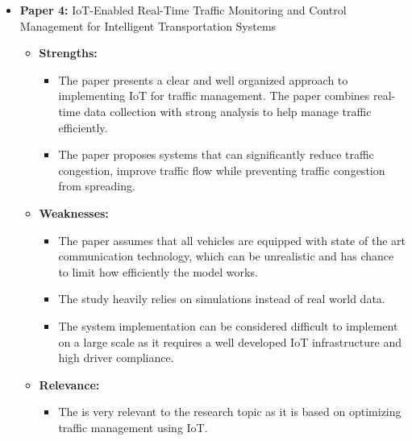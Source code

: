 \documentclass[12pt,a4paper]{article}
\begin{document}
\begin{itemize}
        \item \textbf{Paper 4:} IoT-Enabled Real-Time Traffic Monitoring and Control Management for Intelligent Transportation Systems
        
    \begin{itemize}
    
        \item \textbf{Strengths:} 
        
                \begin{itemize}
            \item The paper presents a clear and well organized approach to implementing IoT for traffic management. The paper combines real-time data collection with strong analysis to help manage traffic efficiently. 
            \item The paper proposes systems that can significantly reduce traffic congestion, improve traffic flow while preventing traffic congestion from spreading.
        \end{itemize}
        
        \item \textbf{Weaknesses:} 
        
                \begin{itemize}
            \item The paper assumes that all vehicles are equipped with state of the art communication technology, which can be unrealistic and has chance to limit how efficiently the model works. 
            \item The study heavily relies on simulations instead of real world data. 
            \item The system implementation can be considered difficult to implement on a large scale as it requires a well developed IoT infrastructure and high driver compliance. 
        \end{itemize}
        \item \textbf{Relevance: } 
        
                \begin{itemize}
                
            \item The is very relevant to the research topic as it is based on optimizing traffic management using IoT.  
        \end{itemize}
    \end{itemize}

\end{itemize}
\end{document}
